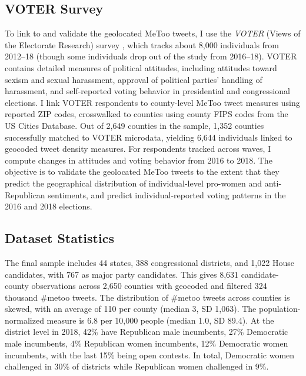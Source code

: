 \documentclass[manuscript,screen,nonacm,11pt,acm]{acmart}
\begin{document}
\subsection{VOTER Survey}
\label{sec:VOTER-data}
To link to and validate the geolocated MeToo tweets, I use the \emph{VOTER} (Views of the Electorate Research) survey \citep{voter}, which tracks about 8,000 individuals from 2012--18 (though some individuals drop out of the study from 2016--18).
VOTER contains detailed measures of political attitudes, including attitudes toward sexism and sexual harassment, approval of political parties' handling of harassment, and self-reported voting behavior in presidential and congressional elections.
I link VOTER respondents to county-level MeToo tweet measures using reported ZIP codes, crosswalked to counties using county FIPS codes from the US Cities Database.
Out of 2,649 counties in the sample, 1,352 counties successfully matched to VOTER microdata, yielding 6,644 individuals linked to geocoded tweet density measures.
For respondents tracked across waves, I compute changes in attitudes and voting behavior from 2016 to 2018.
The objective is to validate the geolocated MeToo tweets to the extent that they predict the geographical distribution of individual-level pro-women and anti-Republican sentiments, and predict individual-reported voting patterns in the 2016 and 2018 elections.

\subsection{Dataset Statistics}
The final sample includes 44 states, 388 congressional districts, and 1,022 House candidates, with 767 as major party candidates.
This gives 8,631 candidate-county observations across 2,650 counties with geocoded and filtered 324 thousand \#metoo tweets.
The distribution of \#metoo tweets across counties is skewed, with an average of 110 per county (median 3, SD 1,063).
The population-normalized measure is 6.8 per 10,000 people (median 1.0, SD 89.4).
At the district level in 2018, 42\% have Republican male incumbents, 27\% Democratic male incumbents, 4\% Republican women incumbents, 12\% Democratic women incumbents, with the last 15\% being open contests.
In total, Democratic women challenged in 30\% of districts while Republican women challenged in 9\%.

\end{document}
